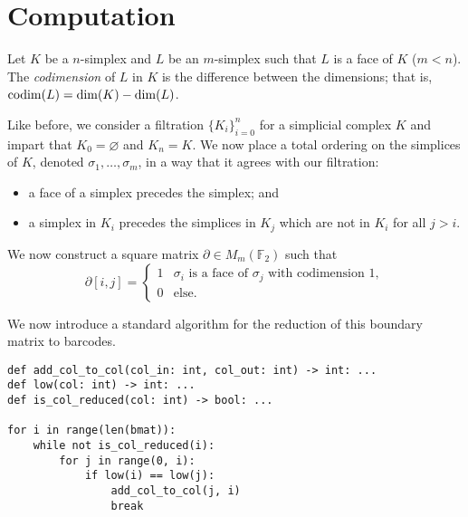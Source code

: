 
\section{Computation}

\begin{definition}[Codimension]
  Let $K$ be a $n$-simplex and $L$ be an $m$-simplex such that $L$ is a face of $K$ ($m < n$). The \emph{codimension} of $L$ in $K$ is the difference between the dimensions; that is, $\operatorname*{codim}(L) = \dim(K) - \dim(L)$.
\end{definition}

Like before, we consider a filtration $\{K_i\}_{i=0}^n$ for a simplicial complex $K$ and impart that $K_0 = \varnothing$ and $K_n = K$. We now place a total ordering on the simplices of $K$, denoted $\sigma_1, \ldots, \sigma_m$, in a way that it agrees with our filtration:
\begin{itemize}
  \item a face of a simplex precedes the simplex; and 
  \item a simplex in $K_i$ precedes the simplices in $K_j$ which are not in $K_i$ for all $j > i$.
\end{itemize}
We now construct a square matrix $\partial \in M_m(\mathbb F_2)$ such that
\[
  \partial[i,j] = \begin{cases}
    1 & \text{$\sigma_i$ is a face of $\sigma_j$ with codimension 1}, \\
    0 & \text{else}.
  \end{cases}  
\]

We now introduce a standard algorithm for the reduction of this boundary matrix to barcodes.

\begin{verbatim}
def add_col_to_col(col_in: int, col_out: int) -> int: ...
def low(col: int) -> int: ...
def is_col_reduced(col: int) -> bool: ...

for i in range(len(bmat)):
    while not is_col_reduced(i):
        for j in range(0, i):
            if low(i) == low(j):
                add_col_to_col(j, i)
                break
\end{verbatim}


